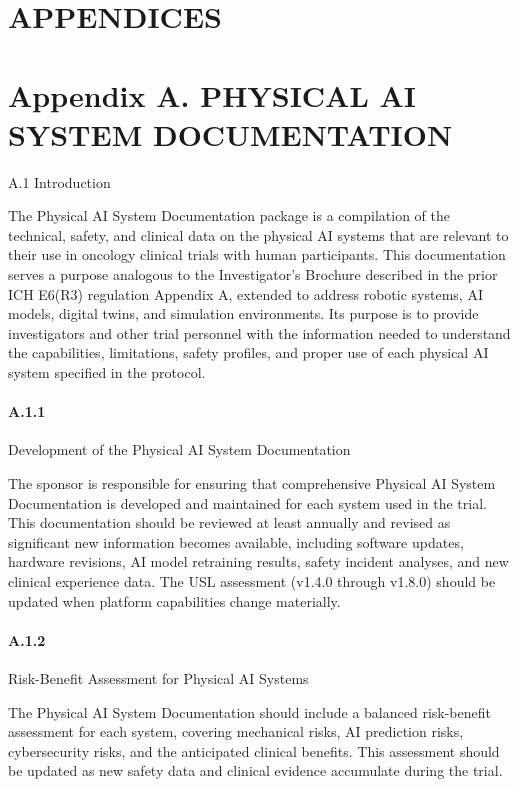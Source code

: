 \documentclass[11pt]{article}
\begin{document}
\section{APPENDICES}

\section{Appendix A. PHYSICAL AI SYSTEM DOCUMENTATION}

A.1 Introduction

The Physical AI System Documentation package is a compilation of the technical, safety, and clinical data on the physical AI systems that are relevant to their use in oncology clinical trials with human participants. This documentation serves a purpose analogous to the Investigator's Brochure described in the prior ICH E6(R3) regulation Appendix A, extended to address robotic systems, AI models, digital twins, and simulation environments. Its purpose is to provide investigators and other trial personnel with the information needed to understand the capabilities, limitations, safety profiles, and proper use of each physical AI system specified in the protocol.

\paragraph{A.1.1} Development of the Physical AI System Documentation

The sponsor is responsible for ensuring that comprehensive Physical AI System Documentation is developed and maintained for each system used in the trial. This documentation should be reviewed at least annually and revised as significant new information becomes available, including software updates, hardware revisions, AI model retraining results, safety incident analyses, and new clinical experience data. The USL assessment (v1.4.0 through v1.8.0) should be updated when platform capabilities change materially.

\paragraph{A.1.2} Risk-Benefit Assessment for Physical AI Systems

The Physical AI System Documentation should include a balanced risk-benefit assessment for each system, covering mechanical risks, AI prediction risks, cybersecurity risks, and the anticipated clinical benefits. This assessment should be updated as new safety data and clinical evidence accumulate during the trial.
\end{document}
